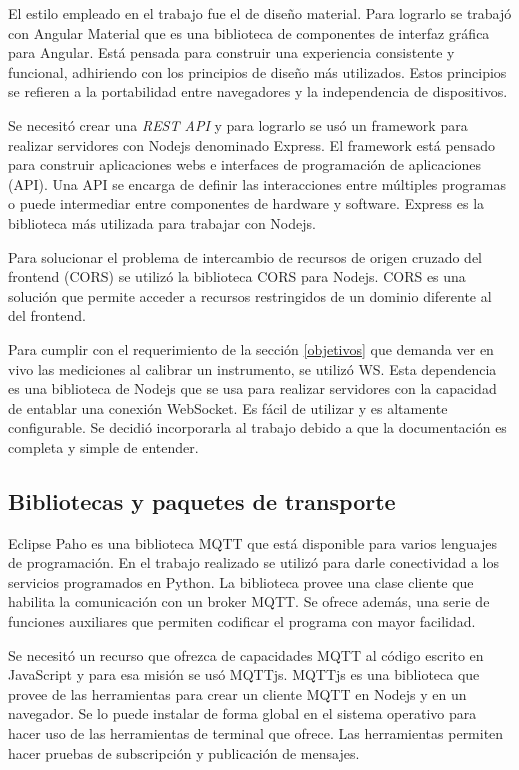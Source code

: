 El estilo empleado en el trabajo fue el de diseño material.
Para lograrlo se trabajó con Angular Material que es una biblioteca de componentes de interfaz gráfica para Angular.
Está pensada para construir una experiencia consistente y funcional, adhiriendo con los principios de diseño más utilizados.
Estos principios se refieren a la portabilidad entre navegadores y la independencia de dispositivos.

Se necesitó crear una \emph{REST API} y para lograrlo se usó un framework para realizar servidores con Nodejs denominado Express.
El framework está pensado para construir aplicaciones webs e interfaces de programación de aplicaciones (API).
Una API se encarga de definir las interacciones entre múltiples programas o puede intermediar entre componentes de hardware y software.
Express es la biblioteca más utilizada para trabajar con Nodejs. \citep{WEBSITE:Express}

Para solucionar el problema de intercambio de recursos de origen cruzado del frontend (CORS) se utilizó la biblioteca CORS para Nodejs.
CORS es una solución que permite acceder a recursos restringidos de un dominio diferente al del frontend.

Para cumplir con el requerimiento de la sección \ref{objetivos} que demanda ver en vivo las mediciones al calibrar un instrumento, se utilizó WS. 
Esta dependencia es una biblioteca de Nodejs que se usa para realizar servidores con la capacidad de entablar una conexión WebSocket.
Es fácil de utilizar y es altamente configurable.
Se decidió incorporarla al trabajo debido a que la documentación es completa y simple de entender.

\subsection{Bibliotecas y paquetes de transporte}
Eclipse Paho es una biblioteca MQTT que está disponible para varios lenguajes de programación.
En el trabajo realizado se utilizó para darle conectividad a los servicios programados en Python.
La biblioteca provee una clase cliente que habilita la comunicación con un broker MQTT.
Se ofrece además, una serie de funciones auxiliares que permiten codificar el programa con mayor facilidad.

Se necesitó un recurso que ofrezca de capacidades MQTT al código escrito en JavaScript y para esa misión se usó MQTTjs.
MQTTjs es una biblioteca que provee de las herramientas para crear un cliente MQTT en Nodejs y en un navegador.
Se lo puede instalar de forma global en el sistema operativo para hacer uso de las herramientas de terminal que ofrece.
Las herramientas permiten hacer pruebas de subscripción y publicación de mensajes.

